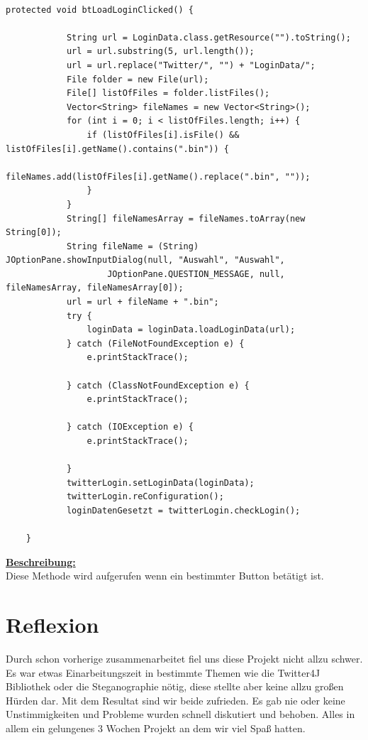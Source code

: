 \documentclass[11pt]{article}
\begin{document}
\begin{lstlisting}[frame=single]  % Start your code-block

protected void btLoadLoginClicked() {
			
			String url = LoginData.class.getResource("").toString();
			url = url.substring(5, url.length());
			url = url.replace("Twitter/", "") + "LoginData/";
			File folder = new File(url);
			File[] listOfFiles = folder.listFiles();
			Vector<String> fileNames = new Vector<String>();
			for (int i = 0; i < listOfFiles.length; i++) {
				if (listOfFiles[i].isFile() && listOfFiles[i].getName().contains(".bin")) {
					fileNames.add(listOfFiles[i].getName().replace(".bin", ""));
				}
			}
			String[] fileNamesArray = fileNames.toArray(new String[0]);
			String fileName = (String) JOptionPane.showInputDialog(null, "Auswahl", "Auswahl",
					JOptionPane.QUESTION_MESSAGE, null, fileNamesArray, fileNamesArray[0]);
			url = url + fileName + ".bin";
			try {
				loginData = loginData.loadLoginData(url);
			} catch (FileNotFoundException e) {
				e.printStackTrace();

			} catch (ClassNotFoundException e) {
				e.printStackTrace();

			} catch (IOException e) {
				e.printStackTrace();

			}
			twitterLogin.setLoginData(loginData);
			twitterLogin.reConfiguration();
			loginDatenGesetzt = twitterLogin.checkLogin();
	
	}

\end{lstlisting}

\underline{\textbf{Beschreibung:}}\\
Diese Methode wird aufgerufen wenn ein bestimmter Button betätigt ist.\\


\newpage
\section{Reflexion}

Durch schon vorherige zusammenarbeitet fiel uns diese Projekt nicht allzu schwer. Es war etwas Einarbeitungszeit in bestimmte Themen wie die Twitter4J Bibliothek oder die Steganographie nötig, diese stellte aber keine allzu großen Hürden dar. Mit dem Resultat sind wir beide zufrieden. Es gab nie oder keine Unstimmigkeiten und Probleme wurden schnell diskutiert und behoben. Alles in allem ein gelungenes 3 Wochen Projekt an dem wir viel Spaß hatten.
\end{document}
